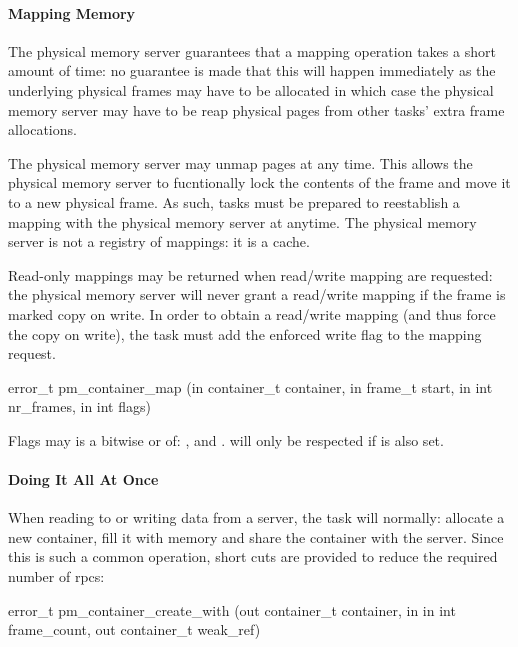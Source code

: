 \paragraph{Mapping Memory}

The physical memory server guarantees that a mapping operation takes a
short amount of time: no guarantee is made that this will happen
immediately as the underlying physical frames may have to be allocated
in which case the physical memory server may have to be reap physical
pages from other tasks' extra frame allocations.

The physical memory server may unmap pages at any time.  This allows
the physical memory server to fucntionally lock the contents of the
frame and move it to a new physical frame.  As such, tasks must be
prepared to reestablish a mapping with the physical memory server at
anytime.  The physical memory server is not a registry of mappings: it
is a cache.

Read-only mappings may be returned when read/write mapping are
requested: the physical memory server will never grant a read/write
mapping if the frame is marked copy on write.  In order to obtain a
read/write mapping (and thus force the copy on write), the task must
add the enforced write flag to the mapping request.

\begin{code}
error\_t pm\_container\_map (in container\_t container, in frame\_t
start, in int nr\_frames, in int flags)
\end{code}

\noindent
Flags may is a bitwise or of: ,
 and .
 will only be respected if
 is also set.

\paragraph{Doing It All At Once}

When reading to or writing data from a server, the task will normally:
allocate a new container, fill it with memory and share the container
with the server.  Since this is such a common operation, short cuts
are provided to reduce the required number of rpcs:

\begin{code}
error\_t pm\_container\_create\_with (out container\_t container, in
in int frame\_count, out container\_t weak\_ref)
\end{code}

